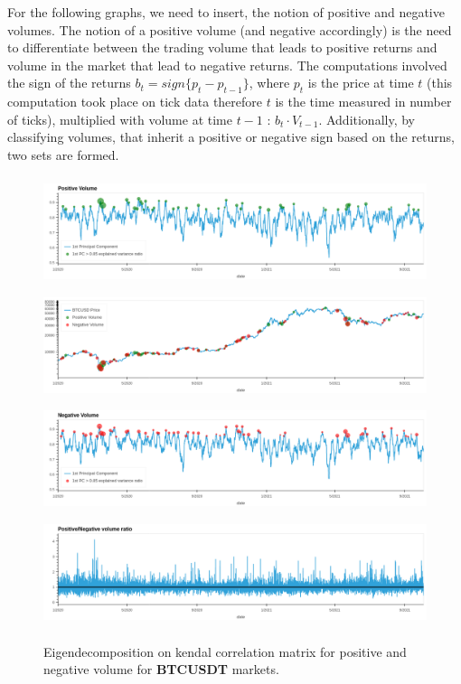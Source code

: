 \documentclass[10pt]{asme2ej}
\begin{document}
For the following graphs, we need to insert, the notion of positive and negative volumes. The notion of a positive volume (and negative accordingly) is the need to differentiate between the trading volume that leads to positive returns and volume in the market that lead to negative returns. The computations involved the sign of the returns \(b_t = sign\{p_t - p_{t-1}\}\), where \(p_t\) is the price at time \(t\) (this computation took place on tick data therefore \(t\) is the time measured in number of ticks), multiplied with volume at time \(t-1\) : \(b_t \cdot V_{t-1}\). Additionally, by classifying volumes, that inherit a positive or negative sign based on the returns, two sets are formed. 

\begin{figure}[H]
	\centering
	\includegraphics[width=12cm, height = 3.2cm]{kendal4.png} \\
	\includegraphics[width=12cm, height = 3.2cm]{kendal3.png} \\ 
	\includegraphics[width=12cm, height = 3.2cm]{kendal1.png} \\
	\includegraphics[width=12cm, height = 3.2cm]{kendal2.png} \\
	\caption{Eigendecomposition on kendal correlation matrix for positive and negative volume for \textbf{BTCUSDT} markets.}
	\label{fig:pcakendall}
\end{figure}
\end{document}
